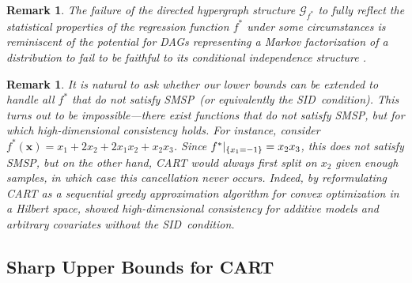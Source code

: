 \documentclass[11pt]{article}
\newtheorem{remark}[theorem]{Remark}
\newcommand{\bx}{\mathbf{x}}
\DeclarePairedDelimiter{\braces}{\lbrace}{\rbrace}
\newcommand{\SID}{\textsf{SID}}
\newcommand{\stabmsp}{\textsf{SMSP}}
\begin{document}
\begin{remark}
    The failure of the directed hypergraph structure $\mathcal{G}_{f^*}$ to fully reflect the statistical properties of the regression function $f^*$ under some circumstances is reminiscent of the potential for DAGs representing a Markov factorization of a distribution to fail to be faithful to its conditional independence structure \citep{uhler2013geometry}.
\end{remark}

\begin{remark}
    It is natural to ask whether our lower bounds can be extended to handle all $f^*$ that do not satisfy \stabmsp~(or equivalently the \SID~condition).
    This turns out to be impossible---there exist functions that do not satisfy \stabmsp, but for which high-dimensional consistency holds.
    For instance, consider $f^*(\bx) = x_1 + 2x_2 + 2x_1x_2 + x_2x_3$.
    Since $f^*|_{\braces*{x_1=-1}} = x_2x_3$, this does not satisfy \stabmsp, but on the other hand, CART would always first split on $x_2$ given enough samples, in which case this cancellation never occurs. Indeed, by reformulating CART as a sequential greedy approximation algorithm for convex optimization in a Hilbert space, \cite{klusowski2024large} showed high-dimensional consistency for additive models and arbitrary covariates without the \SID~condition.
\end{remark}

\subsection{Sharp Upper Bounds for CART}
\end{document}
